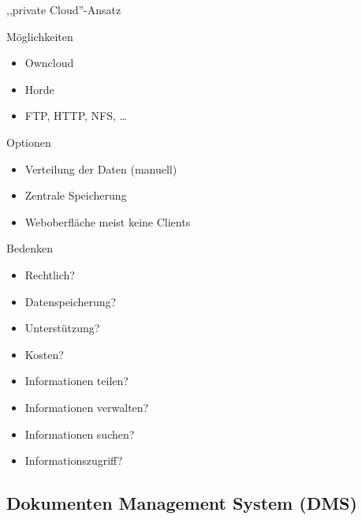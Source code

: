 \documentclass{beamer}
\begin{document}
\begin{frame}[shrink]{,,private Cloud''-Ansatz}
	
	\begin{block}{Möglichkeiten}
		\begin{itemize}
			\item Owncloud 
			\item Horde
			\item FTP, HTTP, NFS, \ldots
		\end{itemize}
		
	\end{block}
	
	\begin{block}{Optionen}
		\begin{itemize}
			\item Verteilung der Daten (manuell)
			\item Zentrale Speicherung
			\item Weboberfläche meist keine Clients
		\end{itemize}
		
		
	\end{block}
	
	
	\begin{block}{Bedenken}
		\begin{multicols}{2}
			\begin{itemize}
				\item Rechtlich? 
				\item Datenspeicherung?
				\item Unterstützung?
				\item Kosten?
				\item Informationen teilen?
				\item Informationen verwalten?
				\item Informationen suchen?
				\item Informationszugriff?
			\end{itemize}		
		\end{multicols}
	\end{block}
	
	\bigskip
	
\end{frame}

\subsection{Dokumenten Management System (DMS)}
\end{document}
